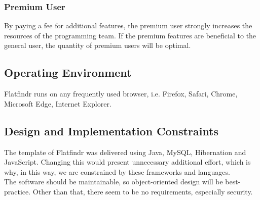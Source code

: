 	\subsubsection{Premium User}
		By paying a fee for additional features, the premium user strongly increases the resources 
		of the programming team. If the premium features are beneficial to the general user, the 
		quantity of premium users will be optimal.
		
\subsection{Operating Environment}
	Flatfindr runs on any frequently used browser, i.e. Firefox, Safari, Chrome, Microsoft Edge, Internet Explorer.
	
\subsection{Design and Implementation Constraints}
	The template of Flatfindr was delivered using Java, MySQL, Hibernation and JavaScript. Changing this would 
	present unnecessary additional effort, which is why, in this way, we are constrained by these frameworks and languages.\\
	The software should be maintainable, so object-oriented design will be best-practice.
	Other than that, there seem to be no requirements, especially security.